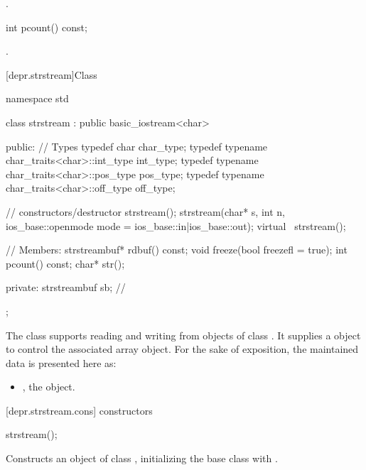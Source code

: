\begin{itemdescr}
\pnum
\returns
{}.
\end{itemdescr}

%
\begin{itemdecl}
int pcount() const;
\end{itemdecl}

\begin{itemdescr}
\pnum
\returns
{}.
\end{itemdescr}

[depr.strstream]{Class }

%
\begin{codeblock}
namespace std {
  class strstream
    : public basic_iostream<char> {
  public:
    // Types
    typedef char                                char_type;
    typedef typename char_traits<char>::int_type int_type;
    typedef typename char_traits<char>::pos_type pos_type;
    typedef typename char_traits<char>::off_type off_type;

    // constructors/destructor
    strstream();
    strstream(char* s, int n,
              ios_base::openmode mode = ios_base::in|ios_base::out);
    virtual ~strstream();

    // Members:
    strstreambuf* rdbuf() const;
    void freeze(bool freezefl = true);
    int pcount() const;
    char* str();

  private:
  strstreambuf sb;  // \expos
  };
}
\end{codeblock}

\pnum
The class
supports reading and writing from objects of class
.
It supplies a
object to control the associated array object.
For the sake of exposition, the maintained data is presented here as:

\begin{itemize}
\item
{}, the  object.
\end{itemize}

[depr.strstream.cons]{ constructors}

%
\begin{itemdecl}
strstream();
\end{itemdecl}

\begin{itemdescr}
\pnum
\effects
Constructs an object of class
,
initializing the base class with
.
\end{itemdescr}

